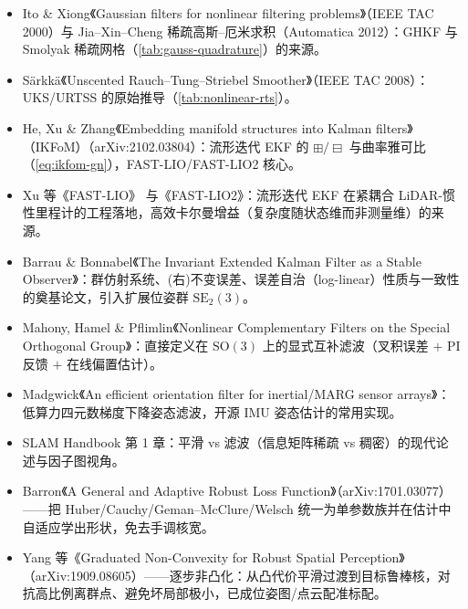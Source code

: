 \begin{itemize}
  \item Ito \& Xiong《Gaussian filters for nonlinear filtering problems》\cite{ito2000gaussian}（IEEE TAC 2000）与 Jia--Xin--Cheng 稀疏高斯--厄米求积\cite{jia2012sparse}（Automatica 2012）：GHKF 与 Smolyak 稀疏网格（\cref{tab:gauss-quadrature}）的来源。
  \item Särkkä《Unscented Rauch--Tung--Striebel Smoother》\cite{sarkka2008unscented}（IEEE TAC 2008）：UKS/URTSS 的原始推导（\cref{tab:nonlinear-rts}）。
  \item He, Xu \& Zhang《Embedding manifold structures into Kalman filters》（IKFoM）\cite{he2021ikfom}（arXiv:2102.03804）：流形迭代 EKF 的 $\boxplus/\boxminus$ 与曲率雅可比（\cref{eq:ikfom-gn}），FAST-LIO/FAST-LIO2 核心。
  \item Xu 等《FAST-LIO》\cite{xu2021fastlio} 与《FAST-LIO2》\cite{xu2022fastlio2}：流形迭代 EKF 在紧耦合 LiDAR-惯性里程计的工程落地，高效卡尔曼增益（复杂度随状态维而非测量维）的来源。
  \item Barrau \& Bonnabel《The Invariant Extended Kalman Filter as a Stable Observer》\cite{barrau2017invariant}：群仿射系统、(右)不变误差、误差自治（log-linear）性质与一致性的奠基论文，引入扩展位姿群 $\mathrm{SE}_2(3)$。
  \item Mahony, Hamel \& Pflimlin《Nonlinear Complementary Filters on the Special Orthogonal Group》\cite{mahony2008nonlinear}：直接定义在 $\mathrm{SO}(3)$ 上的显式互补滤波（叉积误差 $+$ PI 反馈 $+$ 在线偏置估计）。
  \item Madgwick《An efficient orientation filter for inertial/MARG sensor arrays》\cite{madgwick2011estimation}：低算力四元数梯度下降姿态滤波，开源 IMU 姿态估计的常用实现。
  \item SLAM Handbook\cite{carlone2026handbook} 第 1 章：平滑 vs 滤波（信息矩阵稀疏 vs 稠密）的现代论述与因子图视角。
  \item Barron《A General and Adaptive Robust Loss Function》\cite{barron2019general}（arXiv:1701.03077）——把 Huber/Cauchy/Geman--McClure/Welsch 统一为单参数族并在估计中自适应学出形状，免去手调核宽。
  \item Yang 等《Graduated Non-Convexity for Robust Spatial Perception》\cite{yang2020gnc}（arXiv:1909.08605）——逐步非凸化：从凸代价平滑过渡到目标鲁棒核，对抗高比例离群点、避免坏局部极小，已成位姿图/点云配准标配。
\end{itemize}

